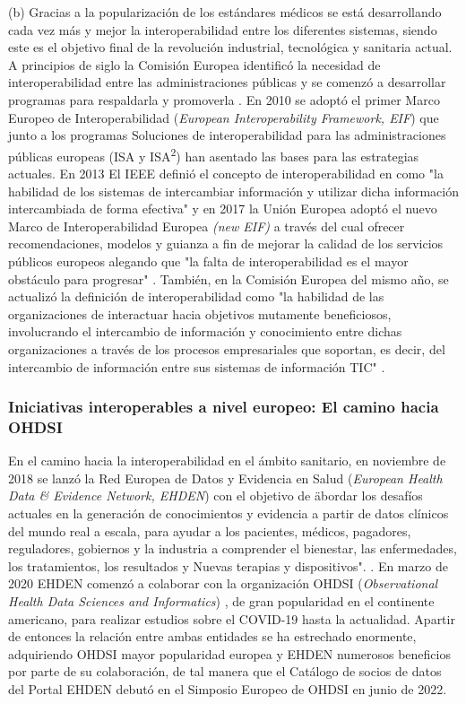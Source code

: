 (b) Gracias a la popularización de los estándares médicos se está desarrollando cada vez más y mejor la interoperabilidad entre los diferentes sistemas, siendo este es el objetivo final de la revolución industrial, tecnológica y sanitaria actual. A principios de siglo la Comisión Europea identificó la necesidad de interoperabilidad entre las administraciones públicas y se comenzó a desarrollar programas para respaldarla y promoverla \cite{CEU1999ida}. En 2010 se adoptó el primer Marco Europeo de Interoperabilidad (\textit{European Interoperability Framework, EIF}) que junto a los programas Soluciones de interoperabilidad para las administraciones públicas europeas (ISA y ISA\textsuperscript{2}) han asentado las bases para las estrategias actuales. En 2013 El IEEE definió el concepto de interoperabilidad en como "la habilidad de los sistemas de intercambiar información y utilizar dicha información intercambiada de forma efectiva" \cite{berryman2013data} y en 2017 la Unión Europea adoptó el nuevo Marco de Interoperabilidad Europea \textit{(new EIF)}  a través del cual ofrecer recomendaciones, modelos y guianza a fin de mejorar la calidad de los servicios públicos europeos alegando que "la falta de interoperabilidad es el mayor obstáculo para progresar" \cite{kouroubali2019new}. También, en la Comisión Europea del mismo año, se actualizó la definición de interoperabilidad como "la habilidad de las organizaciones de interactuar hacia objetivos mutamente beneficiosos, involucrando el intercambio de información y conocimiento entre dichas organizaciones a través de los procesos empresariales que soportan, es decir, del intercambio de información entre sus sistemas de información TIC" \cite{katehakis2019framework}\cite{CEU2017eif} \cite{casiano2022towards}.

\subsubsection{Iniciativas interoperables a nivel europeo: El camino hacia OHDSI}

En el camino hacia la interoperabilidad en el ámbito sanitario, en noviembre de 2018 se lanzó la Red Europea de Datos y Evidencia en Salud (\textit{European Health Data \& Evidence Network, EHDEN}) con el objetivo de \"abordar los desafíos actuales en la generación de conocimientos y evidencia a partir de datos clínicos del mundo real a escala, para ayudar a los pacientes, médicos, pagadores, reguladores, gobiernos y la industria a comprender el bienestar, las enfermedades, los tratamientos, los resultados y Nuevas terapias y dispositivos". \cite{ehden}. En marzo de 2020 EHDEN comenzó a colaborar con la organización OHDSI (\textit{Observational Health Data Sciences and Informatics}) \cite{ohdsi}, de gran popularidad en el continente americano, para realizar estudios sobre el COVID-19 hasta la actualidad. Apartir de entonces la relación entre ambas entidades se ha estrechado enormente, adquiriendo OHDSI mayor popularidad europea y EHDEN numerosos beneficios por parte de su colaboración, de tal manera que el Catálogo de socios de datos del Portal EHDEN debutó en el Simposio Europeo de OHDSI en junio de 2022. 


